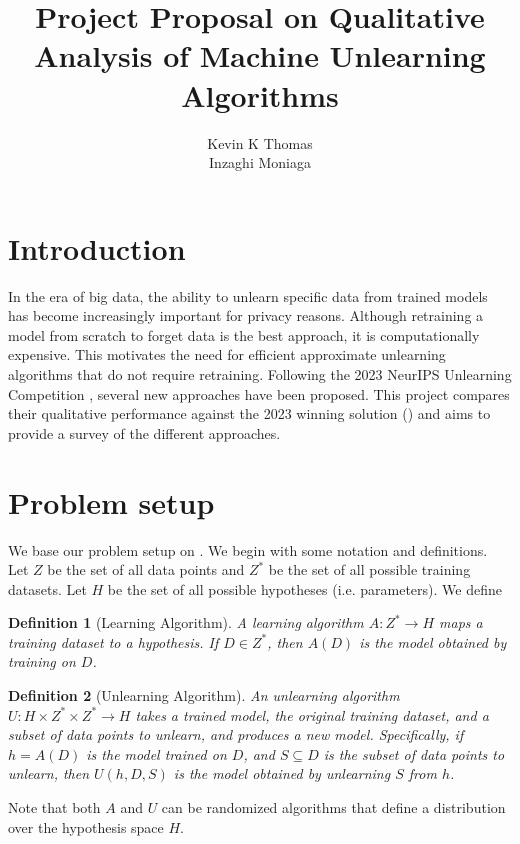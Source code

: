 \documentclass[12pt]{article}
\title{Project Proposal on Qualitative Analysis of Machine Unlearning Algorithms}
\author{Kevin K Thomas \\ Inzaghi Moniaga}
\date{}
\newtheorem{definition}{Definition}[section]
\begin{document}
\maketitle

\section{Introduction}
In the era of big data, the ability to unlearn specific data from trained models has become increasingly important for privacy reasons. 
Although retraining a model from scratch to forget data is the best approach, it is computationally expensive. This motivates the need for efficient approximate unlearning algorithms that do not require retraining. Following the 2023 NeurIPS Unlearning Competition \cite{neurips-2023-machine-unlearning}, several new approaches have been proposed. 
This project compares their qualitative performance against the 2023 winning solution (\cite{2023-winner}) and aims to provide a survey of the different approaches.

\section{Problem setup}
We base our problem setup on \cite{li2025overview}. We begin with some notation and definitions. Let $Z$ be the set of all data points and $Z^*$ be the set of all possible training datasets. Let $H$ be the set of all possible hypotheses (i.e. parameters). We define
\begin{definition}[Learning Algorithm]
    A learning algorithm $A: Z^* \to H$ maps a training dataset to a hypothesis. If $D \in Z^*$, then $A(D)$ is the model obtained by training on $D$.
\end{definition}
\begin{definition}[Unlearning Algorithm]
    An unlearning algorithm $U: H \times Z^* \times Z^* \to H$ takes a trained model, the original training dataset, and a subset of data points to unlearn, and produces a new model. Specifically, if $h = A(D)$ is the model trained on $D$, and $S \subseteq D$ is the subset of data points to unlearn, then $U(h, D, S)$ is the model obtained by unlearning $S$ from $h$.
\end{definition}
Note that both $A$ and $U$ can be randomized algorithms that define a distribution over the hypothesis space $H$. \\
\end{document}
